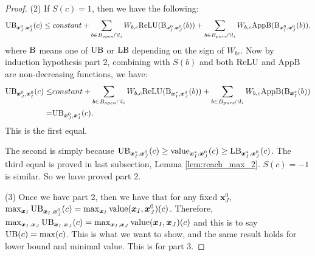 \begin{proof}
					(2) If $S(c)=1$, then we have the following:	\begin{align*}
						\mathrm{UB}_{\boldsymbol{x}^0_J,\boldsymbol{x}^0_I}(c) \leq constant + \sum_{b\in B_{open}\cap l_i} W_{b,c}\mathrm{ReLU}(\mathrm{B}_{\boldsymbol{x}^0_I,\boldsymbol{x}^0_J}(b)) + \sum_{b\in B_{pure}\cap l_{i}} W_{b,c} \mathrm{AppB}(\mathrm{B}_{\boldsymbol{x}^0_I,\boldsymbol{x}^0_J}(b)),
					\end{align*}where $\mathrm{B}$ means one of $\mathrm{UB}$ or $\mathrm{LB}$ depending on the sign of $W_{bc}$. Now by induction hypothesis part 2, combining with $S(b)$ and both $\mathrm{ReLU}$ and $\mathrm{AppB}$ are non-decreasing functions, we have:\begin{align*}
						\mathrm{UB}_{\boldsymbol{x}^0_J,\boldsymbol{x}^0_I}(c)\leq 
						&constant + \sum_{b\in B_{open}\cap l_i} W_{b,c}\mathrm{ReLU}(\mathrm{B}_{\boldsymbol{x}^*_I,\boldsymbol{x}^0_J}(b)) + \sum_{b\in B_{pure}\cap l_{i}} W_{b,c} \mathrm{AppB}(\mathrm{B}_{\boldsymbol{x}^*_I}(b))\\
						= & \mathrm{UB}_{\boldsymbol{x}^0_J,\boldsymbol{x}^*_I}(c). 
					\end{align*}  This is the first equal.
					
					The second is simply because $\mathrm{UB}_{\boldsymbol{x}^*_I,\boldsymbol{x}^0_J}(c)\geq {\textrm{value}}_{\boldsymbol{x}^*_I,\boldsymbol{x}^0_J}(c)\geq\mathrm{LB}_{\boldsymbol{x}^*_I,\boldsymbol{x}^0_J}(c)$.	The third equal is proved in last subsection, Lemma \ref{lem:reach_max_2}. $S(c)=-1$ is similar. So we have proved part 2.
					
					(3) Once we have part 2, then we have that for any fixed $\boldsymbol{x}^0_J$, $\max_{\boldsymbol{x}_I} \mathrm{UB}_{\boldsymbol{x}_I,\boldsymbol{x}^0_J}(c)= \max_{\boldsymbol{x}_I} {\textrm{value}}(\boldsymbol{x}_I,\boldsymbol{x}^0_J)(c)$. Therefore, $\max_{\boldsymbol{x}_I,\boldsymbol{x}_J} \mathrm{UB}_{\boldsymbol{x}_I,\boldsymbol{x}_J}(c)= \max_{\boldsymbol{x}_I,\boldsymbol{x}_J} {\textrm{value}}(\boldsymbol{x}_I,\boldsymbol{x}_J)(c)$ and this is to say $\mathrm{UB}(c)=\max(c)$. This is what we want to show, and the same result holds for lower bound and minimal value. This is for part 3.
					
					
					
					
				\end{proof}
				
				
				
				
